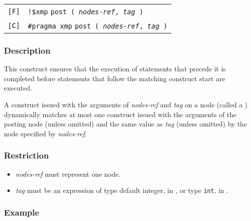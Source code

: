 \begin{tabular}{ll}
\verb![F]! & \verb|!$xmp| {\tt post ( {\it nodes-ref}, {\it tag} )}\\
\verb![C]! & \verb|#pragma xmp| {\tt post ( {\it nodes-ref}, {\it tag} )}\\
\end{tabular}

\subsubsection*{Description}


This construct ensures that the execution of statements that precede
it is completed before statements that follow the matching
 construct start are executed.

A {\tt {}} construct issued with the arguments of {\it
nodes-ref} and {\it tag} on a node (called a {\it {}})
dynamically matches at most one {\tt {}} construct issued
with the arguments of the posting node (unless omitted) 
and the same value as {\it tag} (unless omitted) by the node specified
by {\it nodes-ref}.

\subsubsection*{Restriction}

\begin{itemize}
 \item {\it nodes-ref} must represent one node.
 \item {\it tag} must be an expression of type default integer, in
       {\XMPF}, or type {\tt int}, in {\XMPC}.
\end{itemize}

\subsubsection*{Example}

